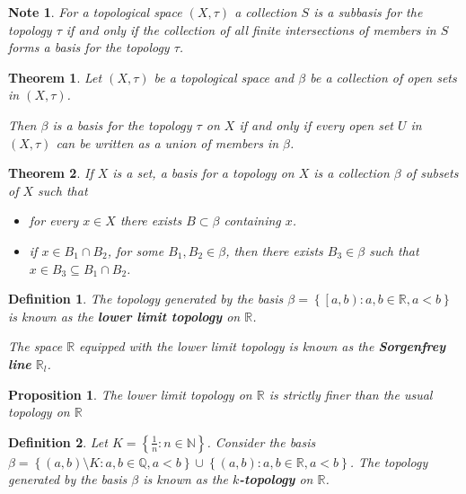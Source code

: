 \documentclass[14pt,twoside]{extreport}
\newtheorem*{defn}{Definition}
\newtheorem*{thm}{Theorem}
\newtheorem*{note}{Note}
\newtheorem*{prop}{Proposition}
\begin{document}
\begin{note}
    For a topological space $\left (X, \tau\right )$ a collection $S$ is a subbasis for the topology $\tau$ if and only if the collection of all finite intersections of members in $S$ forms a basis for the topology $\tau$.
\end{note}

\begin{thm}
    Let $\left (X, \tau\right )$ be a topological space and $\beta$ be a collection of open sets in $\left (X, \tau\right )$.

    Then $\beta$ is a basis for the topology $\tau$ on $X$ if and only if every open set $U$ in $\left (X, \tau\right )$ can be written as a union of members in $\beta$.
\end{thm}

\begin{thm}
    If $X$ is a set, a basis for a topology on $X$ is a collection $\beta$ of subsets of $X$ such that 
    \begin{itemize}
        \item for every $x \in X$ there exists $B \subset \beta$ containing $x$.
        \item if $x \in B_1 \cap B_2$, for some $B_1, B_2 \in \beta$, then there exists $B_3 \in \beta$ such that $x \in B_3 \subseteq B_1 \cap B_2$.
    \end{itemize}
\end{thm}

\begin{defn}
    The topology generated by the basis $\beta = \left\{ \left [a, b\right )  :  a, b \in \mathbb{R}, a < b \right\}$ is known as the \textbf{lower limit topology} on $\mathbb{R}$. 

    The space $\mathbb{R}$ equipped with the lower limit topology is known as the \textbf{Sorgenfrey line} $\mathbb{R}_l$.
\end{defn}

\begin{prop}
    The lower limit topology on $\mathbb{R}$ is strictly finer than the usual topology on $\mathbb{R}$
\end{prop}

\begin{defn}
    Let $K = \left\{ \frac{1}{n}  :  n \in \mathbb{N} \right\}$. Consider the basis \\ $\beta = \left\{ \left (a, b\right ) \setminus K  :  a,b \in \mathbb{Q}, a < b \right\} \cup \left\{ \left (a,b\right )  :  a,b \in \mathbb{R}, a < b \right\}$.  The topology generated by the basis $\beta$ is known as the \textbf{$k$-topology} on $\mathbb{R}$.
\end{defn}
\end{document}
